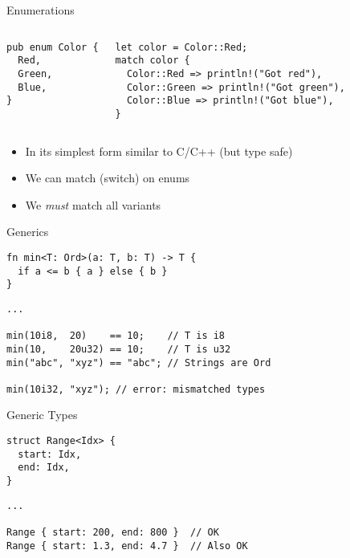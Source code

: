 \begin{frame}[fragile]{Enumerations}
\begin{columns}[t,onlytextwidth]
\begin{verbatim}
pub enum Color {
  Red,
  Green,
  Blue,
}
\end{verbatim}
\begin{verbatim}
let color = Color::Red;
match color {
  Color::Red => println!("Got red"),
  Color::Green => println!("Got green"),
  Color::Blue => println!("Got blue"),
}
\end{verbatim}
\end{columns}
  \begin{itemize}
    \item<1-> In its simplest form similar to C/C++ (but type safe)
    \item<2> We can match (switch) on enums
    \item<2> We \emph{must} match all variants
  \end{itemize}
\end{frame}

\begin{frame}[fragile]{Generics}

\begin{verbatim}
fn min<T: Ord>(a: T, b: T) -> T {
  if a <= b { a } else { b }
}
\end{verbatim}
\pause
\begin{verbatim}
...

min(10i8,  20)    == 10;    // T is i8
min(10,    20u32) == 10;    // T is u32
min("abc", "xyz") == "abc"; // Strings are Ord

min(10i32, "xyz"); // error: mismatched types
\end{verbatim}

\end{frame}


\begin{frame}[fragile]{Generic Types}
\begin{verbatim}
struct Range<Idx> {
  start: Idx,
  end: Idx,
}
\end{verbatim}
\pause
\begin{verbatim}
...

Range { start: 200, end: 800 }  // OK
Range { start: 1.3, end: 4.7 }  // Also OK
\end{verbatim}
\end{frame}


